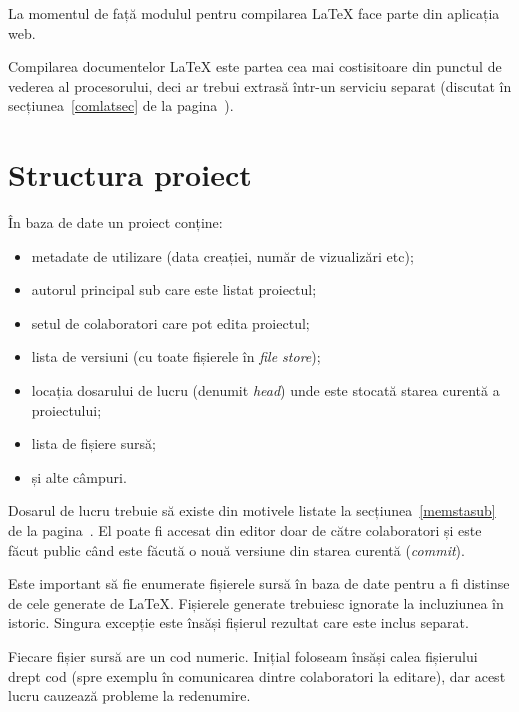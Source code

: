 \documentclass[a4wide,12pt]{report}
\newcommand{\eng}[1]{\emph{#1}} %
\newcommand{\acr}[1]{{\textsmaller[1]{\textsc{#1}}}} %
\begin{document}
La momentul de față modulul pentru compilarea \LaTeX{} face parte din aplicația
web.

Compilarea documentelor \LaTeX{} este partea cea mai costisitoare din punctul de
vederea al procesorului, deci ar trebui extrasă într-un serviciu separat
(discutat în secțiunea~\ref{comlatsec} de la pagina~\pageref{comlatsec}).

\section{Structura proiect}

În baza de date un proiect conține:

\begin{itemize}

\item metadate de utilizare (data creației, număr de vizualizări etc);

\item autorul principal sub care este listat proiectul;

\item setul de colaboratori care pot edita proiectul;

\item lista de versiuni (cu toate fișierele în \eng{file store});

\item locația dosarului de lucru (denumit \eng{head}) unde este stocată starea
curentă a proiectului;

\item lista de fișiere sursă;

\item și alte câmpuri.

\end{itemize}

Dosarul de lucru trebuie să existe din motivele listate la
secțiunea~\ref{memstasub} de la pagina~\pageref{memstasub}. El poate fi accesat
din editor doar de către colaboratori și este făcut public când este făcută o
nouă versiune din starea curentă (\eng{commit}).

Este important să fie enumerate fișierele sursă în baza de date pentru a fi
distinse de cele generate de \LaTeX{}. Fișierele generate trebuiesc ignorate la
incluziunea în istoric. Singura excepție este însăși fișierul \acr{PDF} rezultat
care este inclus separat.

Fiecare fișier sursă are un cod numeric. Inițial foloseam însăși calea
fișierului drept cod (spre exemplu în comunicarea dintre colaboratori la
editare), dar acest lucru cauzează probleme la redenumire.
\end{document}
